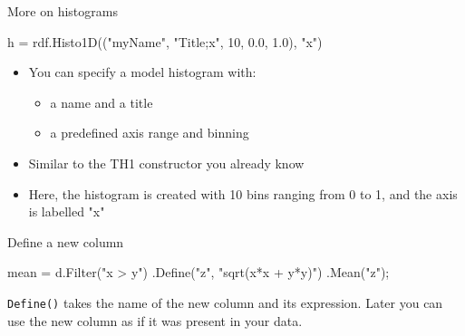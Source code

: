 \documentclass[aspectratio=169]{beamer}
\begin{document}
\begin{frame}[fragile]{More on histograms}
    \begin{pycell}
        h = rdf.Histo1D(("myName", "Title;x", 10, 0.0, 1.0), "x")
    \end{pycell}
    \begin{itemize}
        \item You can specify a model histogram with:
        \begin{itemize}
            \item a name and a title
            \item a predefined axis range and binning
        \end{itemize}
        \item Similar to the TH1 constructor you already know
        \item Here, the histogram is created with 10 bins ranging from 0 to 1, and the axis is labelled "x"
    \end{itemize}
\end{frame}

\begin{frame}[fragile]{Define a new column}
\begin{pycell}
mean = d.Filter("x > y")
        .Define("z", "sqrt(x*x + y*y)")
        .Mean("z");
\end{pycell}
\texttt{Define()} takes the name of the new column and its
expression. Later you can use the new column as if it
was present in your data.
\end{frame}
\end{document}
